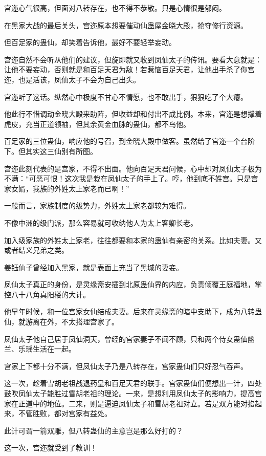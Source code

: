 \begin{this_body}
宫迩心气很高，但面对八转存在，也不得不恭敬。只是心情很是郁闷。

在黑家大战的最后关头，宫迩原本想要催动仙蛊屋金晓大殿，抢夺修行资源。

但百足家的蛊仙，却笑着告诉他，最好不要轻举妄动。

宫迩自然不会听从他们的建议，但旋即就又收到凤仙太子的传讯。要看大意就是：让他不要妄动，否则就是和百足天君为敌！若惹恼百足天君，让他出手杀了你宫迩，也是活该，凤仙太子不会为自己出头。

宫迩听了这话。纵然心中极度不甘心不情愿，也不敢出手，狠狠吃了个大瘪。

他此行不惜调动金晓大殿来助阵，但收益却和付出不成比例。本来，宫迩是想撑着虎皮，充当正道领袖，但其余黄金血脉的蛊仙，都不鸟他。

百足家的三位蛊仙，响应他的号召，到金晓大殿中做客。虽然给了宫迩一个台阶下。但其实这三仙别有所图。

宫迩此刻代表的是宫家，不得不出面。他向百足天君问候，心中却对凤仙太子极为不满：“可恶可恨！这次我是栽在凤仙太子的手上了。哼，他到底不姓宫。只是宫家女婿，我族的外姓太上家老而已啊！”

一般而言，家族制度的级势力，外姓太上家老都较为难得。

不像中洲的级门派，那么容易就可收纳他人为太上客卿长老。

加入级家族的外姓太上家老，往往都要和本家的蛊仙有亲密的关系。比如夫妻。又或者结义兄弟之类。

姜钰仙子曾经加入黑家，就是表面上充当了黑城的妻妾。

凤仙太子真正的身份，是灵缘斋安插到北原蛊仙界的内应，负责倾覆王庭福地，掌控八十八角真阳楼的大计。

他早年时候，和一位宫家女仙结成夫妻。后来在灵缘斋的暗中支助下，成为八转蛊仙，就游离在外，不太搭理宫家了。

凤仙太子他自己居于凤仙洞天，曾经的宫家妻子不闻不顾，只和两个侍女蛊仙幽兰、乐瑶生活在一起。

宫家上下都十分不满，但凤仙太子乃是八转存在，宫家蛊仙们只好忍气吞声。

这一次，趁着雪胡老祖战退药皇和百足天君的联手。宫家蛊仙们便想出一计，四处鼓吹凤仙太子能胜过雪胡老祖的理论。一来，是想利用凤仙太子的影响力，提高宫家在正道中的地位。二来，则是逼迫凤仙太子和雪胡老祖对立。若是双方能对掐起来，不管胜败，都对宫家有益处。

此计可谓一箭双雕，但八转蛊仙的主意岂是那么好打的？

这一次，宫迩就受到了教训！


\end{this_body}
